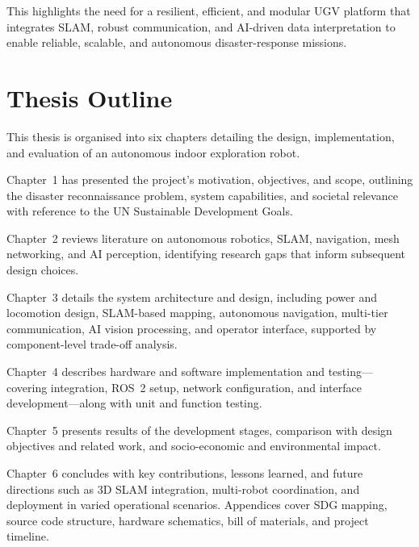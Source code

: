 This highlights the need for a resilient, efficient, and modular UGV platform that integrates SLAM, robust communication, and AI-driven data interpretation to enable reliable, scalable, and autonomous disaster-response missions.

\section{Thesis Outline}
\label{sec:outline}

This thesis is organised into six chapters detailing the design, implementation, and evaluation of an autonomous indoor exploration robot.

Chapter~1 has presented the project's motivation, objectives, and scope, outlining the disaster reconnaissance problem, system capabilities, and societal relevance with reference to the UN Sustainable Development Goals.

Chapter~2 reviews literature on autonomous robotics, SLAM, navigation, mesh networking, and AI perception, identifying research gaps that inform subsequent design choices.

Chapter~3 details the system architecture and design, including power and locomotion design, SLAM-based mapping, autonomous navigation, multi-tier communication, AI vision processing, and operator interface, supported by component-level trade-off analysis.

Chapter~4 describes hardware and software implementation and testing---covering integration, ROS~2 setup, network configuration, and interface development---along with unit and function testing.

Chapter~5 presents results of the development stages, comparison with design objectives and related work, and socio-economic and environmental impact.

Chapter~6 concludes with key contributions, lessons learned, and future directions such as 3D SLAM integration, multi-robot coordination, and deployment in varied operational scenarios. Appendices cover SDG mapping, source code structure, hardware schematics, bill of materials, and project timeline.
